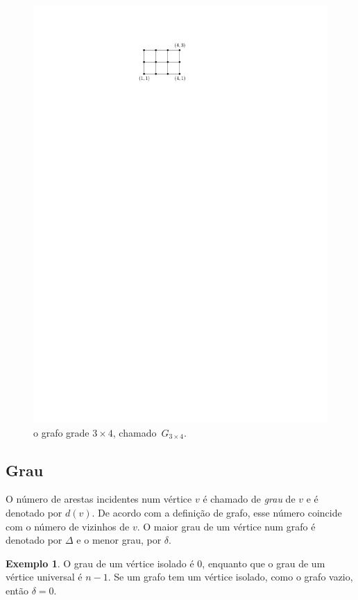 \documentclass[12pt, a4paper]{article}
\theoremstyle{definition}
\newtheorem{exem}[teor]{Exemplo}
\begin{document}
\begin{figure}[H]
    \centering
    \includegraphics{grade.pdf}
    \caption{o grafo grade $3\times 4$, chamado~$G_{3\times 4}$.}
    \label{fig:grade}
\end{figure}
\subsection{Grau}

O número de arestas incidentes num vértice $v$ é chamado de \emph{grau} de $v$ e é denotado por $d(v)$. De acordo com a definição de grafo, esse número coincide com o número de vizinhos de $v$. O maior grau de um vértice num grafo é denotado por $\Delta$ e o menor grau, por $\delta$.

\begin{exem}
O grau de um vértice isolado é $0$, enquanto que o grau de um vértice universal é $n - 1$. Se um grafo tem um vértice isolado, como o grafo vazio, então $\delta = 0$. 
\end{exem}
\end{document}
